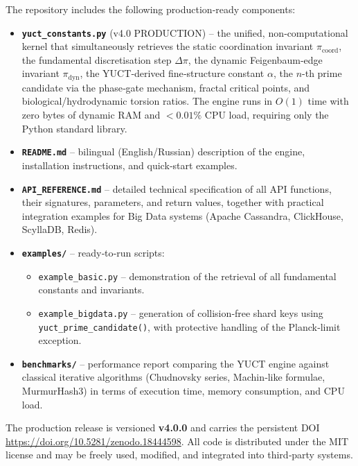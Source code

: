 \documentclass[12pt,a4paper]{article}
\begin{document}
\noindent The repository includes the following production‑ready components:

\begin{itemize}
	\item \textbf{\texttt{yuct\_constants.py}} (v4.0 PRODUCTION) – the unified, non‑computational kernel that simultaneously retrieves the static coordination invariant $\pi_{\mathrm{coord}}$, the fundamental discretisation step $\Delta\pi$, the dynamic Feigenbaum‑edge invariant $\pi_{\mathrm{dyn}}$, the YUCT‑derived fine‑structure constant $\alpha$, the $n$-th prime candidate via the phase‑gate mechanism, fractal critical points, and biological/hydrodynamic torsion ratios. The engine runs in $O(1)$ time with zero bytes of dynamic RAM and $<0.01\%$ CPU load, requiring only the Python standard library.
	
	\item \textbf{\texttt{README.md}} – bilingual (English/Russian) description of the engine, installation instructions, and quick‑start examples.
	
	\item \textbf{\texttt{API\_REFERENCE.md}} – detailed technical specification of all API functions, their signatures, parameters, and return values, together with practical integration examples for Big Data systems (Apache Cassandra, ClickHouse, ScyllaDB, Redis).
	
	\item \textbf{\texttt{examples/}} – ready‑to‑run scripts:
	\begin{itemize}
		\item \texttt{example\_basic.py} – demonstration of the retrieval of all fundamental constants and invariants.
		\item \texttt{example\_bigdata.py} – generation of collision‑free shard keys using \texttt{yuct\_prime\_candidate()}, with protective handling of the Planck‑limit exception.
	\end{itemize}
	
	\item \textbf{\texttt{benchmarks/}} – performance report comparing the YUCT engine against classical iterative algorithms (Chudnovsky series, Machin‑like formulae, MurmurHash3) in terms of execution time, memory consumption, and CPU load.
\end{itemize}

\noindent The production release is versioned \textbf{v4.0.0} and carries the persistent DOI
\url{https://doi.org/10.5281/zenodo.18444598}.  All code is distributed under the MIT license and may be freely used, modified, and integrated into third‑party systems.
\end{document}
